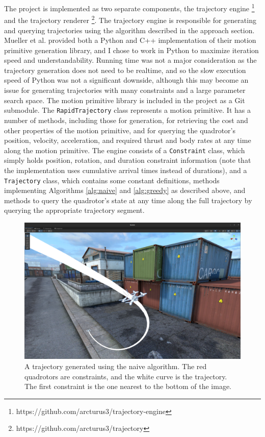 \documentclass[pageno]{jpaper}
\begin{document}
The project is implemented as two separate components, the trajectory engine \footnote{https://github.com/arcturus3/trajectory-engine} and the trajectory renderer \footnote{https://github.com/arcturus3/trajectory}. The trajectory engine is responsible for generating and querying trajectories using the algorithm described in the approach section. Mueller et al. provided both a Python and C++ implementation of their motion primitive generation library, and I chose to work in Python to maximize iteration speed and understandability. Running time was not a major consideration as the trajectory generation does not need to be realtime, and so the slow execution speed of Python was not a significant downside, although this may become an issue for generating trajectories with many constraints and a large parameter search space. The motion primitive library is included in the project as a Git submodule. The \texttt{RapidTrajectory} class represents a motion primitive. It has a number of methods, including those for generation, for retrieving the cost and other properties of the motion primitive, and for querying the quadrotor's position, velocity, acceleration, and required thrust and body rates at any time along the motion primitive. The engine consists of a \texttt{Constraint} class, which simply holds position, rotation, and duration constraint information (note that the implementation uses cumulative arrival times instead of durations), and a \texttt{Trajectory} class, which contains some constant definitions, methods implementing Algorithms \ref{alg:naive} and \ref{alg:greedy} as described above, and methods to query the quadrotor's state at any time along the full trajectory by querying the appropriate trajectory segment.

\begin{figure}[hbt]
  \includegraphics[width=\linewidth]{data/constraint.png}
  \caption{A trajectory generated using the naive algorithm. The red quadrotors are constraints, and the white curve is the trajectory. The first constraint is the one nearest to the bottom of the image.}
  \label{fig:constraint}
\end{figure}
\end{document}

